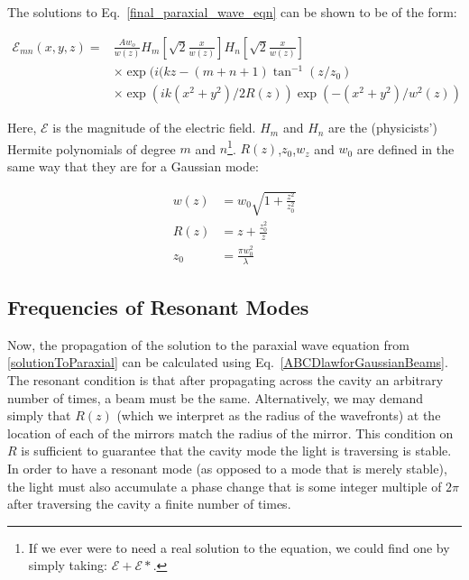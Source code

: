 The solutions to Eq.\ \ref{final_paraxial_wave_eqn} can be shown to be of the form:

\begin{align} \label{solutionToParaxial}
\mathcal{E}_{mn}(x,y,z)=&\frac{Aw_o}{w(z)}H_m\left[\sqrt{2}\frac{x}{w(z)}\right]H_n\left[\sqrt{2}\frac{x}{w(z)}\right] \\
&\times \exp(i(kz-(m+n+1)\tan^{-1}(z/z_0)\\
&\times \exp(ik(x^2+y^2)/2R(z)) \exp(-(x^2+y^2)/w^2(z))
\end{align}

Here, $\mathcal{E}$ is the magnitude of the electric field. $H_m$ and $H_n$ are the (physicists') Hermite polynomials of degree $m$ and $n$\footnote{If we ever were to need a real solution to the equation, we could find one by simply taking: $\mathcal{E}+\mathcal{E}*$.}. $R(z)$,$z_0$,$w_z$ and $w_0$ are defined in the same way that they are for a Gaussian mode:

\begin{align}
w(z)&=w_0 \sqrt{1+\frac{z^2}{z_0^2}} \\
R(z)&=z+\frac{z_0^2}{z}\\
z_0&=\frac{\pi w_0^2}{\lambda }
\end{align}


\subsection{Frequencies of Resonant Modes}
Now, the propagation of the solution to the paraxial wave equation from \ref{solutionToParaxial} can be calculated using Eq.\ \ref{ABCDlawforGaussianBeams}. The resonant condition is that after propagating across the cavity an arbitrary number of times, a beam must be the same\cite{lasersMilonniEberly}.
Alternatively, we may demand simply that $R(z)$ (which we interpret as the radius of the wavefronts) at the location of each of the mirrors match the radius of the mirror. This condition on $R$ is sufficient to guarantee that the cavity mode the light is traversing is stable. In order to have a resonant mode (as opposed to a mode that is merely stable), the light must also accumulate a phase change that is some integer multiple of $2\pi$ after traversing the cavity a finite number of times.

